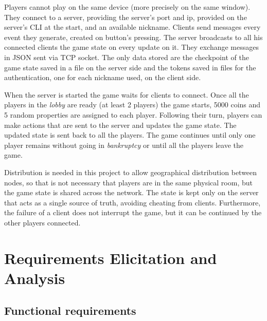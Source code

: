 \documentclass{scrartcl}
\begin{document}
Players cannot play on the same device (more precisely on the same window).
They connect to a server, providing the server's port and ip,
provided on the server's CLI at the start, and an available nickname.
Clients send messages every event they generate, created on button's pressing.
The server broadcasts to all his connected clients the game state on every update on it.
They exchange messages in JSON sent via TCP socket.
The only data stored are the checkpoint of the game state saved in a file on the server side
and the tokens saved in files for the authentication, one for each nickname used, on the client side.


When the server is started the game waits for clients to connect.
Once all the players in the \textit{lobby} are ready (at least 2 players)
the game starts, 5000 coins and 5 random properties are assigned to each player.
Following their turn, players can make actions that are sent to the server and updates the game state.
The updated state is sent back to all the players.
The game continues until only one player remains without going in \textit{bankruptcy}
or until all the players leave the game.


Distribution is needed in this project to allow geographical distribution between nodes,
so that is not necessary that players are in the same physical room, but the game state is shared across the network.
The state is kept only on the server that acts as a single source of truth, avoiding cheating from clients.
Furthermore, the failure of a client does not interrupt the game, but it can be continued by the other players connected.

\section{Requirements Elicitation and Analysis}\label{requirements}
\subsection{Functional requirements}\label{functional_requirements}
\end{document}
